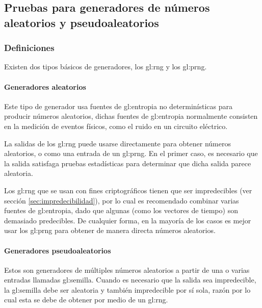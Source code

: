 %
%

\subsection{Pruebas para generadores de números aleatorios y pseudoaleatorios}
\label{sec:pruebas_para_generadores}


\subsubsection{Definiciones} %

Existen dos tipos básicos de generadores, los \gls{gl:rng} y los \gls{gl:prng}.

\paragraph{Generadores aleatorios} %

Este tipo de generador usa fuentes de \gls{gl:entropia} no determinísticas
para producir números aleatorios, dichas fuentes de \gls{gl:entropia}
normalmente consisten en la medición de eventos físicos, como el ruido
en un circuito eléctrico.

La salidas de los \gls{gl:rng} puede usarse directamente para obtener números
aleatorios, o como una entrada de un \gls{gl:prng}. En el primer caso, es
necesario que la salida satisfaga pruebas estadísticas para determinar que
dicha salida parece aleatoria.

Los \gls{gl:rng} que se usan con fines criptográficos tienen que ser
impredecibles (ver sección \ref{sec:impredecibilidad}), por lo cual es
recomendado combinar varias fuentes de \gls{gl:entropia}, dado que algunas
(como los vectores de tiempo) son demasiado predecibles. De cualquier forma,
en la mayoría de los casos es mejor usar los \gls{gl:prng} para obtener de
manera directa números aleatorios.

\paragraph{Generadores pseudoaleatorios} %

Estos son generadores de múltiples números aleatorios a partir de una o varias
entradas llamadas \gls{gl:semilla}. Cuando es necesario que la salida sea
impredecible, la \gls{gl:semilla} debe ser aleatoria y también impredecible
por sí sola, razón por lo cual esta se debe de obtener por medio de un
\gls{gl:rng}.

